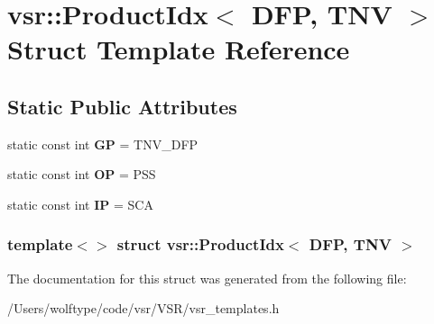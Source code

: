 \hypertarget{structvsr_1_1_product_idx_3_01_d_f_p_00_01_t_n_v_01_4}{\section{vsr\-:\-:Product\-Idx$<$ D\-F\-P, T\-N\-V $>$ Struct Template Reference}
\label{structvsr_1_1_product_idx_3_01_d_f_p_00_01_t_n_v_01_4}
}
\subsection*{Static Public Attributes}
\begin{DoxyCompactItemize}
\item 
\hypertarget{structvsr_1_1_product_idx_3_01_d_f_p_00_01_t_n_v_01_4_af071df6b740717741fde019103689380}{static const int {\bfseries G\-P} = T\-N\-V\-\_\-\-D\-F\-P}\label{structvsr_1_1_product_idx_3_01_d_f_p_00_01_t_n_v_01_4_af071df6b740717741fde019103689380}

\item 
\hypertarget{structvsr_1_1_product_idx_3_01_d_f_p_00_01_t_n_v_01_4_a0d9a3b0852bdf4a7d1f882bdeab0b97a}{static const int {\bfseries O\-P} = P\-S\-S}\label{structvsr_1_1_product_idx_3_01_d_f_p_00_01_t_n_v_01_4_a0d9a3b0852bdf4a7d1f882bdeab0b97a}

\item 
\hypertarget{structvsr_1_1_product_idx_3_01_d_f_p_00_01_t_n_v_01_4_a2fb901ac0b7e282a97ec817ec2c57781}{static const int {\bfseries I\-P} = S\-C\-A}\label{structvsr_1_1_product_idx_3_01_d_f_p_00_01_t_n_v_01_4_a2fb901ac0b7e282a97ec817ec2c57781}

\end{DoxyCompactItemize}
\subsubsection*{template$<$$>$ struct vsr\-::\-Product\-Idx$<$ D\-F\-P, T\-N\-V $>$}



The documentation for this struct was generated from the following file\-:\begin{DoxyCompactItemize}
\item 
/\-Users/wolftype/code/vsr/\-V\-S\-R/vsr\-\_\-templates.\-h\end{DoxyCompactItemize}
